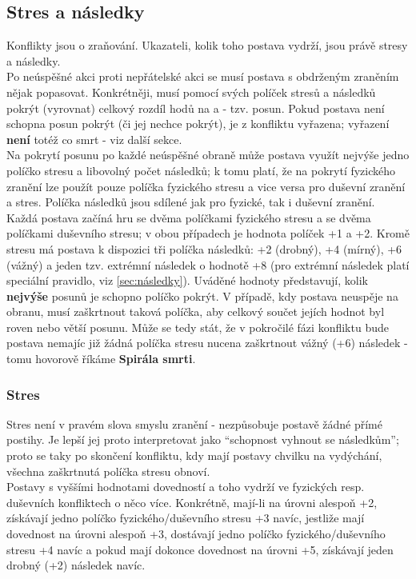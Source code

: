 \documentclass[../main.tex]{subfiles}
\begin{document}
\subsection{Stres a následky}
\label{sec:stres-nasledky}

Konflikty jsou o zraňování. Ukazateli, kolik toho postava vydrží, jsou právě stresy a následky.\\
Po neúspěšné akci  proti nepřátelské akci  se musí postava s obdrženým zraněním nějak popasovat. Konkrétněji, musí pomocí svých políček stresů a následků pokrýt (vyrovnat) celkový rozdíl hodů na  a  - tzv. posun. Pokud postava není schopna posun pokrýt (či jej nechce pokrýt), je z konfliktu vyřazena; vyřazení \textbf{není} totéž co smrt - viz další sekce.\\
Na pokrytí posunu po každé neúspěšné obraně může postava využít nejvýše jedno políčko stresu a libovolný počet následků; k tomu platí, že na pokrytí fyzického zranění lze použít pouze políčka fyzického stresu a vice versa pro duševní zranění a stres. Políčka následků jsou sdílené jak pro fyzické, tak i duševní zranění.\\
Každá postava začíná hru se dvěma políčkami fyzického stresu a se dvěma políčkami duševního stresu; v obou případech je hodnota políček +1 a +2. Kromě stresu má postava k dispozici tři políčka následků: +2 (drobný), +4 (mírný), +6 (vážný) a jeden tzv. extrémní následek o hodnotě +8 (pro extrémní následek platí speciální pravidlo, viz \ref{sec:následky}). Uváděné hodnoty představují, kolik \textbf{nejvýše} posunů je schopno políčko pokrýt. V případě, kdy postava neuspěje na obranu, musí zaškrtnout taková políčka, aby celkový součet jejích hodnot byl roven nebo větší posunu. Může se tedy stát, že v pokročilé fázi konfliktu bude postava nemajíc již žádná políčka stresu nucena zaškrtnout vážný (+6) následek - tomu hovorově říkáme \textbf{Spirála smrti}.\\

\subsubsection{Stres}
\label{sec:stres}

Stres není v pravém slova smyslu zranění - nezpůsobuje postavě žádné přímé postihy. Je lepší jej proto interpretovat jako ``schopnost vyhnout se následkům''; proto se taky po skončení konfliktu, kdy mají postavy chvilku na vydýchání, všechna zaškrtnutá políčka stresu obnoví.\\
Postavy s vyššími hodnotami dovedností  a  toho vydrží ve fyzických resp. duševních konfliktech o něco více. Konkrétně, mají-li  na úrovni alespoň +2, získávají jedno políčko fyzického/duševního stresu +3 navíc, jestliže mají dovednost na úrovni alespoň +3, dostávají jedno políčko fyzického/duševního stresu +4 navíc a pokud mají dokonce dovednost na úrovni +5, získávají jeden drobný (+2) následek navíc.
\end{document}
